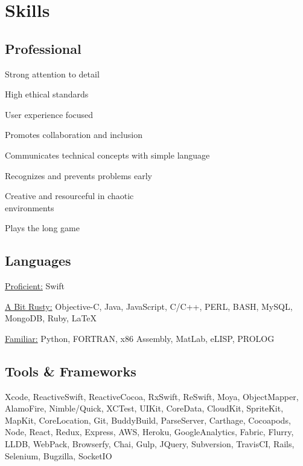 \documentclass[]{jhearn-resume}
\begin{document}
\begin{minipage}[t]{0.34\textwidth} 

\section{Skills}


\subsection{Professional}
\vspace{\topsep} 
\begin{tightemize}
\item Strong attention to detail
\item High ethical standards
\item User experience focused
\item Promotes collaboration and inclusion
\item Communicates technical concepts with simple language
\item Recognizes and prevents problems early
\item Creative and resourceful in chaotic \\ environments
\item Plays the long game
\end{tightemize}
\sectionsep

\subsection{Languages}
\underline{Proficient:} Swift \par
\underline{A Bit Rusty:} Objective-C, Java, JavaScript, C/C++, PERL, BASH, MySQL, MongoDB, Ruby, { \LaTeX} \par
\underline{Familiar:} Python, FORTRAN, x86 Assembly, MatLab, eLISP, PROLOG \\
\sectionsep
\vspace{-\topsep}

\subsection{Tools \& Frameworks}
\raggedright Xcode, ReactiveSwift, ReactiveCocoa, RxSwift, ReSwift, Moya, ObjectMapper, AlamoFire, Nimble/Quick, XCTest, UIKit, CoreData, CloudKit, SpriteKit, MapKit, CoreLocation, Git, BuddyBuild, ParseServer, Carthage, Cocoapods, Node, React, Redux, Express, AWS, Heroku, GoogleAnalytics, Fabric, Flurry, LLDB,  WebPack, Browserfy, Chai, Gulp, JQuery, Subversion, TravisCI, Rails, Selenium, Bugzilla, SocketIO
\sectionsep

\end{minipage}
\end{document}

